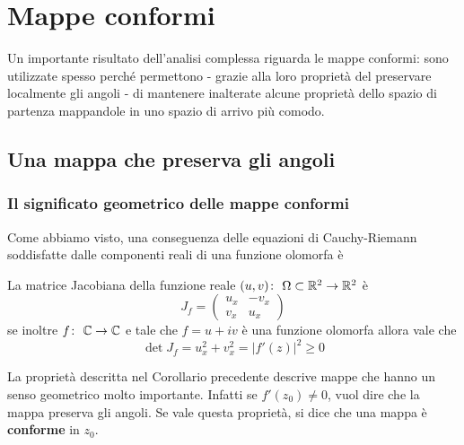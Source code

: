 \chapter{Mappe conformi}
Un importante risultato dell'analisi complessa riguarda le mappe conformi: sono utilizzate spesso perché permettono - grazie alla loro proprietà del preservare localmente gli angoli - di mantenere inalterate alcune proprietà dello spazio di partenza mappandole in uno spazio di arrivo più comodo.
\newpage
\section{Una mappa che preserva gli angoli}
\subsection{\textcolor{AnComp}{\textbf{Il significato geometrico delle mappe conformi}}}

Come abbiamo visto, una conseguenza delle equazioni di Cauchy-Riemann soddisfatte dalle componenti
reali di una funzione olomorfa è 

\begin{corollary}
  La matrice Jacobiana della funzione reale $(u,v) \colon\ \Omega \subset
  \mathbb{R}^2 \rightarrow \mathbb{R}^2$ è
  \begin{equation*}
    J_f = \left(\begin{array}{cc} 
        u_x & -v_x\\
        v_x & u_x
    \end{array}\right) 
  \end{equation*}
  se inoltre $f \colon\ \mathbb{C} \rightarrow \mathbb{C}$ e tale che $f = u + iv$ è una funzione
  olomorfa allora vale che
  \begin{equation*}
    \det J_f = u^2_x + v^2_x = |f'(z)|^2 \ge 0 
  \end{equation*}
\end{corollary}

\begin{remark}
  La proprietà descritta nel Corollario precedente descrive mappe che hanno un 
  senso geometrico molto importante. Infatti se $f'(z_0) \neq 0$, vuol dire che
  la mappa preserva gli angoli. Se vale questa proprietà, si dice che una mappa
  è \textbf{conforme} in $z_0$.
  \label{rmk:conforme_intuizione}
\end{remark}
